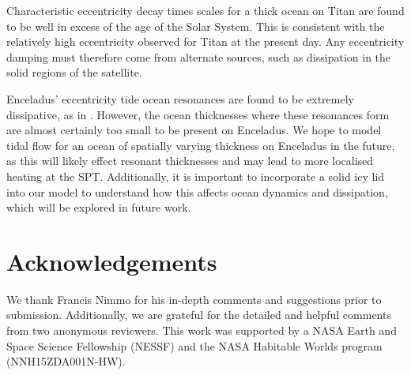 Characteristic eccentricity decay times scales for a thick ocean on Titan are found to be well in excess of the age of the Solar System. This is consistent with the relatively high eccentricity observed for Titan at the present day. Any eccentricity damping must therefore come from alternate sources, such as dissipation in the solid regions of the satellite.

Enceladus' eccentricity tide ocean resonances are found to be extremely dissipative, as in \citet{tyler2011tidal, matsuyama2014tidal}. However, the ocean thicknesses where these resonances form are almost certainly too small to be present on Enceladus. We hope to model tidal flow for an ocean of spatially varying thickness on Enceladus in the future, as this will likely effect resonant thicknesses and may lead to more localised heating at the SPT. Additionally, it is important to incorporate a solid icy lid into our model to understand how this affects ocean dynamics and dissipation, which will be explored in future work. 

\section{Acknowledgements}

We thank Francis Nimmo for his in-depth comments and suggestions prior to submission. Additionally, we are grateful for the detailed and helpful comments from two anonymous reviewers. This work was supported by a NASA Earth and Space Science Fellowship (NESSF) and the NASA Habitable Worlds program (NNH15ZDA001N-HW).